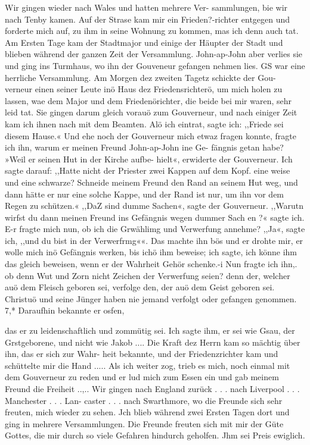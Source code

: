Wir gingen wieder nach Wales und hatten mehrere Ver-
sammlungen, bie wir nach Tenby kamen. Auf der Strase kam
mir ein Frieden?-richter entgegen und forderte mich auf, zu ihm
in seine Wohnung zu kommen, mas ich denn auch tat. Am
Ersten Tage kam der Stadtmajor und einige der Häupter der
Stadt und blieben während der ganzen Zeit der Versammlung.
John-ap-John aber verlies sie und ging ins Turmhaus, wo ihn
der Gouveneur gefangen nehmen lies. GS war eine herrliche
Versammlung. Am Morgen dez zweiten Tagetz schickte der Gou-
verneur einen seiner Leute inö Haus dez Friedensrichterö, um mich
holen zu lassen, wae dem Major und dem Friedenörichter, die
beide bei mir waren, sehr leid tat. Sie gingen darum gleich
vorauö zum Gouverneur, und nach einiger Zeit kam ich ihnen nach
mit dem Beamten. Alö ich eintrat, sagte ich: ,,Friede sei diesem
Hause.« Und ehe noch der Gouverneur mich etwaz fragen konnte,
fragte ich ihn, warum er meinen Freund John-ap-John ine Ge-
fängnis getan habe? »Weil er seinen Hut in der Kirche aufbe-
hielt«, erwiderte der Gouverneur. Ich sagte darauf: ,,Hatte nicht
der Priester zwei Kappen auf dem Kopf. eine weise und eine
schwarze? Schneide meinem Freund den Rand an seinem Hut
weg, und dann hätte er nur eine solche Kappe, und der Rand
ist nur, um ihn vor dem Regen zu schützen.« ,,DaZ sind dumme
Sachen«, sagte der Gouverneur. ,,Warutn wirfst du dann meinen
Freund ins Gefängnis wegen dummer Sach en ?« sagte ich. E-r fragte
mich nun, ob ich die Grwählimg und Verwerfung annehme?
,,Ja«, sagte ich, ,,und du bist in der Verwerfrmg««. Das machte
ihn bös und er drohte mir, er wolle mich inö Gefängnis werken,
bis ichö ihm beweise; ich sagte, ich könne ihm das gleich beweisen,
wenn er der Wahrheit Gehör schenke.-i Nun fragte ich ihn,. ob denn
Wut und Zorn nicht Zeichen der Verwerfung seien? denn der,
welcher auö dem Fleisch geboren sei, verfolge den, der auö dem
Geist geboren sei. Christuö und seine Jünger haben nie jemand
verfolgt oder gefangen genommen. 7,* Daraufhin bekannte er osfen,


das er zu leidenschaftlich und zommütig sei. Ich sagte ihm, er
sei wie Gsau, der Grstgeborene, und nicht wie Jakob .... Die
Kraft dez Herrn kam so mächtig über ihn, das er sich zur Wahr-
heit bekannte, und der Friedenzrichter kam und schüttelte mir
die Hand ..... Als ich weiter zog, trieb es mich, noch einmal
mit dem Gouverneur zu reden und er lud mich zum Essen ein
und gab meinem Freund die Freiheit ..,.. Wir gingen nach
England zurück . . . nach Liverpool . . . Manchester . . . Lan-
caster . . . nach Swarthmore, wo die Freunde sich sehr freuten,
mich wieder zu sehen. Jch blieb während zwei Ersten Tagen
dort und ging in mehrere Versammlungen. Die Freunde freuten
sich mit mir der Güte Gottes, die mir durch so viele Gefahren
hindurch geholfen. Jhm sei Preis ewiglich.
